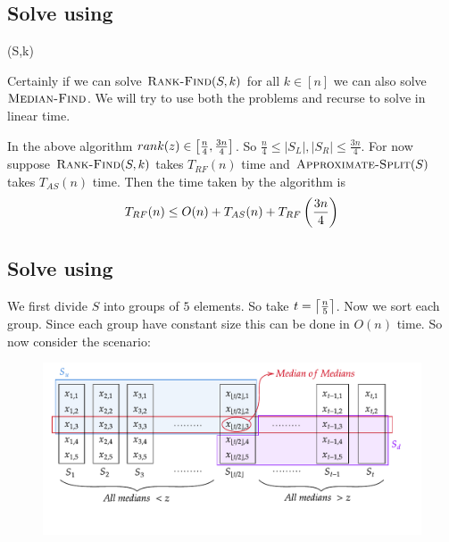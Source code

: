 \subsection{Solve  using }
\begin{algorithm}
	\DontPrintSemicolon
\caption{(S,k)}
\end{algorithm}
\parinn

Certainly if we can solve $\textsc{Rank-Find}(S,k)$ for all $k\in[n]$ we can also solve $\textsc{Median-Find}$. We will try to use both the problems and recurse to solve  in linear time. 

In the above algorithm $rank(z)\in \left[\frac{n}{4},\frac{3n}{4}\right]$. So $\frac{n}4\leq |S_L|,|S_R|\leq \frac{3n}4$. For now suppose $\textsc{Rank-Find}(S,k)$ takes $T_{RF}(n)$ time and $\textsc{Approximate-Split}(S)$ takes $T_{AS}(n)$ time. Then the time taken by the algorithm is  $$T_{RF}(n)\leq O(n)+T_{AS}(n)+T_{RF}\left(\frac{3n}4\right)$$
\subsection{Solve  using }
We first divide $S$ into groups of $5$ elements. So take $t=\left\lceil\frac{n}5\right\rceil$. Now we sort each group. Since each group have constant size this can be done in $O(n)$ time. So now consider the scenario:
\begin{figure}[h]
	\centering
	\includegraphics{images/approx-split-using-rankfind}
\end{figure}

